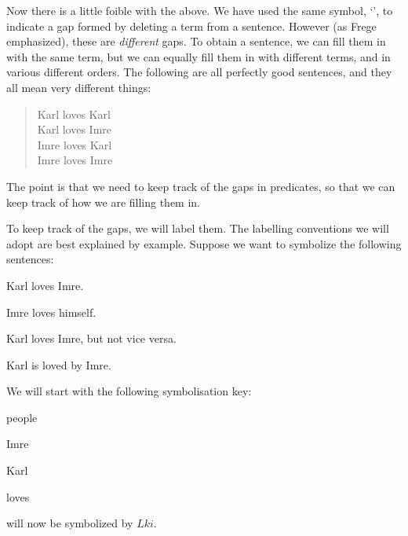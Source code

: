 Now there is a little foible with the above. We have used the same symbol, `\blank', to indicate a gap formed by deleting a term from a sentence. However (as Frege emphasized), these are \emph{different} gaps. To obtain a sentence, we can fill them in with the same term, but we can equally fill them in with different terms, and in various different orders. The following are all perfectly good sentences, and they all mean very different things:
	\begin{quote}
		Karl loves Karl\\
		Karl loves Imre\\
		Imre loves Karl\\
		Imre loves Imre
	\end{quote}
The point is that we need to keep track of the gaps in predicates, so that we can keep track of how we are filling them in.

To keep track of the gaps, we will label them. The labelling conventions we will adopt are best explained by example. Suppose we want to symbolize the following sentences:
	\begin{samplesent}
		\item\label{sent:terms3} Karl loves Imre.
		\item\label{sent:terms4} Imre loves himself.
		\item\label{sent:terms5} Karl loves Imre, but not vice versa.
		\item\label{sent:terms6} Karl is loved by Imre.
	\end{samplesent}
We will start with the following symbolisation key:
	\begin{ekey}
		\item[\text{domain}] people
		\item[i] Imre
		\item[k] Karl
		\item[Lxy]  loves 
	\end{ekey}
 will now be symbolized by $Lki$.

